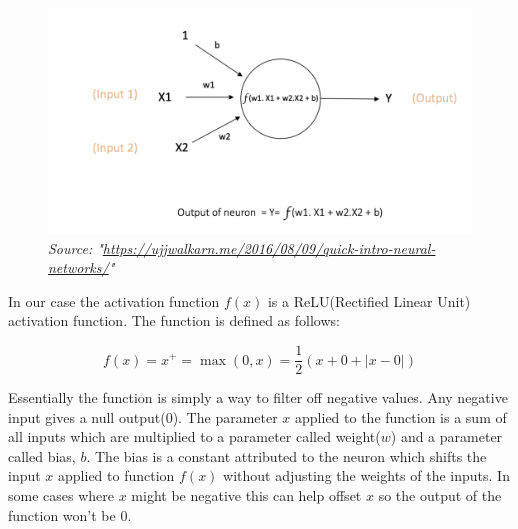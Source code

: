 \documentclass[9pt,onecolumn,oneside]{osajnl}
\begin{document}
    
    \begin{figure}[h]
      \centering
      \begin{minipage}[b]{0.6\textwidth}
        \centering
        \includegraphics[width=\textwidth]{neuron.png}
        \\
         \textit{Source: "\url{https://ujjwalkarn.me/2016/08/09/quick-intro-neural-networks/}"}
      \end{minipage}
    \end{figure}

	In our case the activation function \(f(x)\) is a ReLU(Rectified Linear Unit) activation function. The function is defined as follows:
    
    \[{\displaystyle f(x)=x^{+}=\max(0,x)=\frac{1}{2}(x+0+|x-0|)}\]
    
    Essentially the function is simply a way to filter off negative values. Any negative input gives a null output(\(0\)). The parameter \(x\) applied to the function is a sum of all inputs which are multiplied to a parameter called weight(\(w\)) and a parameter called bias, \(b\). The bias is a constant attributed to the neuron which shifts the input \(x\) applied to function \(f(x)\) without adjusting the weights of the inputs. In some cases where \(x\) might be negative this can help offset \(x\) so the output of the function won't be \(0\).
    
\end{document}

